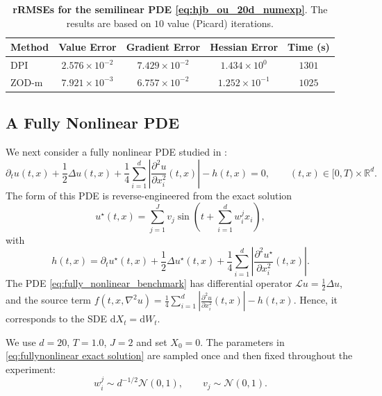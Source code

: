 \documentclass[twoside,11pt]{article}
\newcommand{\dd}{\mathrm{d}}
\newcommand{\1}{\mathbf{1}}
\numberwithin{equation}{section}
\begin{document}
\begin{table}[h]
    \centering
    \caption{\textbf{rRMSEs for the semilinear PDE \eqref{eq:hjb_ou_20d_numexp}}. The results are based on $10$ value (Picard) iterations.}
    \label{tab:hjb_ou_20d_final}
    \small
    \begin{tabular}{lcccc}
        \toprule
        {Method} & {Value Error} & {Gradient Error} & {Hessian Error} & {Time (s)} \\
        \midrule
        DPI & $2.576\times10^{-2}$ & $7.429\times10^{-2}$ & $1.434\times10^{0}$ & $1301$ \\
        ZOD-m & $7.921\times10^{-3}$ & $6.757\times10^{-2}$ & $1.252\times10^{-1}$ & $1025$ \\
        \bottomrule
    \end{tabular}
\end{table}




\subsection{A Fully Nonlinear PDE}\label{sec:fully nonlinear}

We next consider a fully nonlinear PDE studied in \cite{han26}:
\begin{equation}\label{eq:fully_nonlinear_benchmark}
    \partial_t u(t,x)
    +\frac{1}{2}\Delta u(t,x)
    +\frac{1}{4}\sum_{i=1}^{d}
    \left|\frac{\partial^2 u}{\partial x_i^2}(t,x)\right|
    -h(t,x)=0,
    \qquad (t,x)\in[0,T)\times\mathbb R^d .
\end{equation}
The form of this PDE is reverse-engineered from the exact solution
\begin{equation}\label{eq:fullynonlinear exact solution}
    u^\star(t,x)=\sum_{j=1}^{J} v_j
    \sin\!\left(t+\sum_{i=1}^{d} w_i^j x_i\right),
\end{equation}
with
\begin{equation}
    h(t,x)=
    \partial_t u^\star(t,x)
    +\frac{1}{2}\Delta u^\star(t,x)
    +\frac{1}{4}\sum_{i=1}^{d}
    \left|\frac{\partial^2 u^\star}{\partial x_i^2}(t,x)\right|.
\end{equation}
The PDE \eqref{eq:fully_nonlinear_benchmark} has differential operator $\mathcal L u = \frac{1}{2}\Delta u$, and the source term $f(t,x,\nabla^2 u) = \frac{1}{4}\sum_{i=1}^{d}
\left|\frac{\partial^2 u}{\partial x_i^2}(t,x)\right|-h(t,x)$. Hence, it corresponds to the SDE
$\dd X_t = \dd W_t$.


We use $d=20$, $T=1.0$, $J=2$ and set $ X_0 = 0$. The parameters in \eqref{eq:fullynonlinear exact solution} are sampled once and then fixed throughout the experiment:
\[
    w_i^j\sim d^{-1/2}\mathcal N(0,1),
    \qquad
    v_j\sim\mathcal N(0,1).
\]
\end{document}
